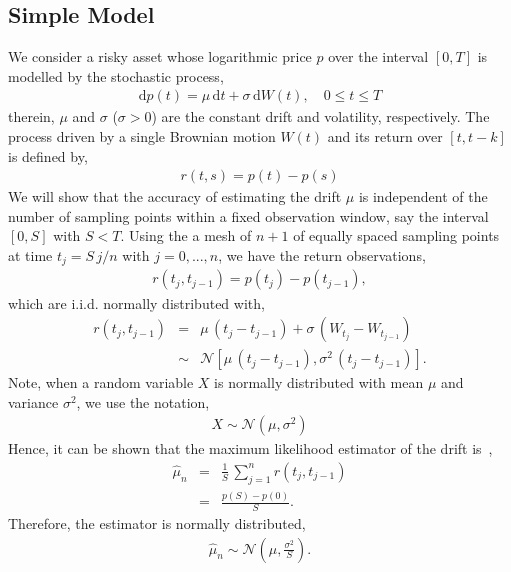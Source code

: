 \documentclass[11pt, a4paper]{thesis}  %
\newcommand{\dd}{\textrm{d}}
\begin{document}
\subsection{Simple Model}
\label{subsection_simple_model}
%
We consider a risky asset whose logarithmic price $p$ over the interval $[0,T]$ is modelled by the stochastic process, 
%
\begin{eqnarray}
	\dd p(t) = \mu\,\dd t  + \sigma\,\dd W(t),\quad 0\leq t \leq T
	\label{simple_model_log_price} 	
\end{eqnarray}
%
therein, $\mu$ and $\sigma$ ($\sigma > 0$) are the constant drift and volatility, respectively. The process driven by a single Brownian motion $W(t)$ and its return over $[t,t-k]$ is defined by,
%
\begin{eqnarray}
	r(t,s) = p(t)-p(s)
\end{eqnarray} 
%
We will show that the accuracy of estimating the drift $\mu$ is independent of the number of sampling points within a fixed observation window, say the interval $[0, S]$ with $S < T$. Using the a mesh of $n+1$ of equally spaced sampling points at time $t_j = S\,j/n$ with $j=0,...,n$, we have the return observations,
%
\begin{eqnarray}
	r\left(t_j, t_{j-1}\right) = p\left(t_j\right) - p\left(t_{j-1}\right),
	\label{equation:log_return}
\end{eqnarray} 
% 
which are i.i.d. normally distributed with,
\begin{eqnarray}
	r\left(t_j, t_{j-1}\right) 
	&=& \mu\,\left(t_j-t_{j-1}\right) + \sigma\,\left(W_{t_j}-W_{t_{j-1}}\right)
	\\\nonumber
	&\sim & \mathcal{N}\left[\mu\,\left(t_j-t_{j-1}\right),\sigma^2\,\left(t_j-t_{j-1}\right)\right].
\end{eqnarray}
%
Note, when a random variable $X$ is normally distributed with mean $\mu$ and variance $\sigma^2$, we use the notation,
%
\begin{eqnarray}
	X \sim \mathcal{N}\left(\mu, \sigma^2\right)
\end{eqnarray}
%
Hence, it can be shown that the maximum likelihood estimator of the drift is~\cite{Andersen:2008:realized_vol}, 
%
\begin{eqnarray}
	\hat{\mu}_n &=& \frac{1}{S}\,\sum_{j=1}^{n} r\left(t_j, t_{j-1}\right) 
	\\\nonumber
	&=& \frac{p(S)-p(0)}{S}.
\end{eqnarray} 
%
Therefore, the estimator is normally distributed,  
%
\begin{eqnarray}
	\hat{\mu}_n \sim \mathcal{N}\left(\mu, \frac{\sigma^2}{S}\right).
	\label{simple_model_drift_estimator}
\end{eqnarray}
\end{document}
